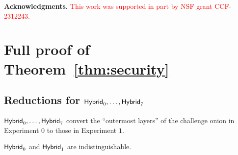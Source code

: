 \documentclass[runningheads,a4paper]{llncs}
\begin{document}
\medskip
\noindent
\textbf{Acknowledgments.} 
\textcolor{red}{
This work was supported in part by NSF grant CCF-2312243.
}



%
%

 

\appendix 

\newpage
\section{Full proof of Theorem~\ref{thm:security}} \label{app:security} 

\subsection{Reductions for $\mathsf{Hybrid}_{0}, \dots, \mathsf{Hybrid}_{7}$}
$\mathsf{Hybrid}_{0}, \dots, \mathsf{Hybrid}_{7}$ convert the ``outermost layers'' of the challenge onion in Experiment $0$ to those in Experiment $1$. 

\begin{lemma}
$\mathsf{Hybrid}_{0}$ and $\mathsf{Hybrid}_{1}$ are indistinguishable. 
\end{lemma}
\end{document}
